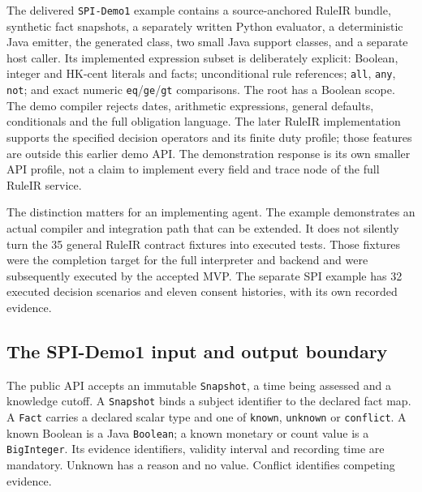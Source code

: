 The delivered \texttt{SPI-Demo1} example contains a source-anchored RuleIR bundle,
synthetic fact snapshots, a separately written Python evaluator, a deterministic
Java emitter, the generated class, two small Java support classes, and a separate
host caller. Its implemented expression subset is deliberately explicit:
Boolean, integer and HK-cent literals and facts; unconditional rule references;
\texttt{all}, \texttt{any}, \texttt{not}; and exact numeric
\texttt{eq}/\texttt{ge}/\texttt{gt} comparisons. The root has a Boolean scope.
The demo compiler rejects dates, arithmetic expressions, general defaults,
conditionals and the full obligation language. The later RuleIR implementation
supports the specified decision operators and its finite duty profile; those
features are outside this earlier demo API. The demonstration response is its own smaller API profile,
not a claim to implement every field and trace node of the full RuleIR service.


The distinction matters for an implementing agent. The example demonstrates an
actual compiler and integration path that can be extended. It does not silently
turn the 35 general RuleIR contract fixtures into executed tests. Those fixtures were the completion target for the full interpreter and
backend and were subsequently executed by the accepted MVP. The separate
SPI example has 32 executed decision scenarios and eleven consent histories, with
its own recorded evidence.

\subsection{The SPI-Demo1 input and output boundary}
\label{merge:P-03d-java-delivery:02}


The public API accepts an immutable \texttt{Snapshot}, a time being assessed and
a knowledge cutoff. A \texttt{Snapshot} binds a subject identifier to the
declared fact map. A \texttt{Fact} carries a declared scalar type and one of
\texttt{known}, \texttt{unknown} or \texttt{conflict}. A known Boolean is a Java
\texttt{Boolean}; a known monetary or count value is a \texttt{BigInteger}.
Its evidence identifiers, validity interval and recording time are mandatory.
Unknown has a reason and no value. Conflict identifies competing evidence.

